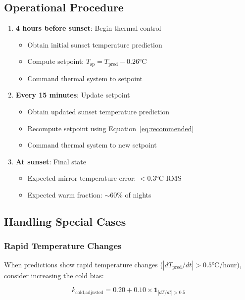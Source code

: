 \documentclass[11pt,letterpaper]{article}
\begin{document}
\subsection{Operational Procedure}

\begin{enumerate}
    \item \textbf{4 hours before sunset}: Begin thermal control
    \begin{itemize}
        \item Obtain initial sunset temperature prediction
        \item Compute setpoint: $T_{\text{sp}} = T_{\text{pred}} - 0.26$°C
        \item Command thermal system to setpoint
    \end{itemize}

    \item \textbf{Every 15 minutes}: Update setpoint
    \begin{itemize}
        \item Obtain updated sunset temperature prediction
        \item Recompute setpoint using Equation~\ref{eq:recommended}
        \item Command thermal system to new setpoint
    \end{itemize}

    \item \textbf{At sunset}: Final state
    \begin{itemize}
        \item Expected mirror temperature error: $< 0.3$°C RMS
        \item Expected warm fraction: $\sim 60\%$ of nights
    \end{itemize}
\end{enumerate}

\subsection{Handling Special Cases}

\subsubsection{Rapid Temperature Changes}

When predictions show rapid temperature changes ($|dT_{\text{pred}}/dt| > 0.5$°C/hour), consider increasing the cold bias:

\begin{equation}
k_{\text{cold,adjusted}} = 0.20 + 0.10 \times \mathbf{1}_{|dT/dt| > 0.5}
\end{equation}
\end{document}
